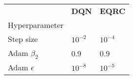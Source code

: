 \begin{tabular}{lll}
 & \bfseries DQN & \bfseries EQRC \\
Hyperparameter &  &  \\
Step size & $10^{-2}$ & $10^{-4}$ \\
Adam $\beta_2$ & 0.9 & 0.9 \\
Adam $\epsilon$ & $10^{-8}$ & $10^{-5}$ \\
\end{tabular}
